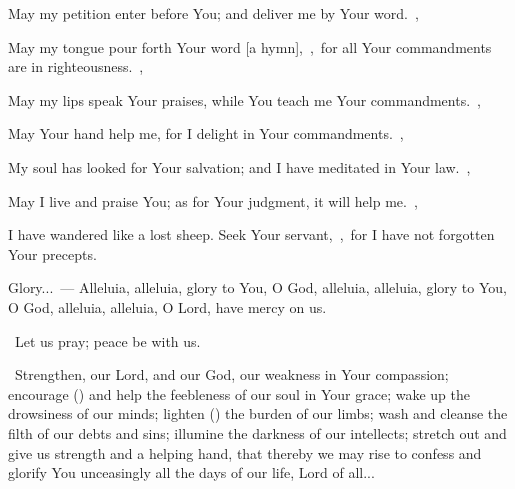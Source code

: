 \documentclass[12pt,twoside,a5paper]{article}
\begin{document}
\begin{halfparskip}
  May my petition enter before You; and deliver me by Your word.~\sep

  May my tongue pour forth Your word [a hymn],~\sep\ for all Your commandments are in righteousness.~\sep

  May my lips speak Your praises, while You teach me Your commandments.~\sep

  May Your hand help me, for I delight in Your commandments.~\sep

  My soul has looked for Your salvation; and I have meditated in Your law.~\sep

  May I live and praise You; as for Your judgment, it will help me.~\sep

  I have wandered like a lost sheep. Seek Your servant,~\sep\ for I have not forgotten Your precepts.

  Glory...~--- Alleluia, alleluia, glory to You, O God, alleluia, alleluia, glory to You, O God, alleluia, alleluia, O Lord, have mercy on us.
\end{halfparskip}

\dd~Let us pray; peace be with us.

\cc~Strengthen, our Lord, and our God, our weakness in Your compassion; encourage () and help the feebleness of our soul in Your grace; wake up the drowsiness of our minds; lighten () the burden of our limbs; wash and cleanse the filth of our debts and sins; illumine the darkness of our intellects; stretch out and give us strength and a helping hand, that thereby we may rise to confess and glorify You unceasingly all the days of our life, Lord of all...


\end{document}
